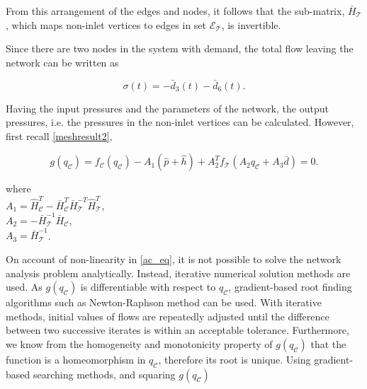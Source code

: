 From this arrangement of the edges and nodes, it follows that the sub-matrix, $\bar{H}_{\mathcal{T}}$, which maps non-inlet vertices to edges in set $\mathcal{E}_{\mathcal{T}}$, is invertible. 

Since there are two nodes in the system with demand, the total flow leaving the network can be written as

\begin{equation}
  \label{consumption1}
  \sigma(t) = -\bar{d}_3(t) - \bar{d}_6(t).
\end{equation}

Having the input pressures and the parameters of the network, the output pressures, i.e. the pressures in the non-inlet vertices can be calculated. However, first recall \eqref{meshresult2}, 

\begin{equation}
  \label{ac_eq} 
  g(q_{\mathcal{C}}) = f_{\mathcal{C}}(q_\mathcal{C}) - A_1(\hat{p} + \hat{h}) + A_2^T f_{\mathcal{T}}(A_2 q_\mathcal{C} + A_3 \bar{d}) = 0.
\end{equation}

\begin{minipage}[t]{0.4\textwidth}
where\\
\hspace*{8mm} $A_1 = \hat{H}^T_{\mathcal{C}} -\bar{H}^T_{\mathcal{C}}\bar{H}^{-T}_{\mathcal{T}}\hat{H}^T_{\mathcal{T}}$, \vspace*{1.5mm}  \\
\hspace*{8mm} $A_2 = -\bar{H}^{-1}_{\mathcal{T}} \bar{H}_{\mathcal{C}} $, \vspace*{1.5mm}\\
\hspace*{8mm} $A_3 = \bar{H}^{-1}_{\mathcal{T}}$. 
\end{minipage}

On account of non-linearity in \eqref{ac_eq},  it is not possible to solve the network analysis problem analytically. Instead, iterative numerical solution methods are used. As $g(q_{\mathcal{C}})$ is differentiable with respect to $q_{\mathcal{C}}$, gradient-based root finding algorithms such as Newton-Raphson method can be used. With iterative methods, initial values of flows are repeatedly adjusted until the difference between two successive iterates is within an acceptable tolerance.  Furthermore, we know from the homogeneity and monotonicity property of $g(q_{\mathcal{C}})$ that the function is a homeomorphism in $q_{\mathcal{C}}$, therefore its root is unique. Using gradient-based searching methods, and squaring $g(q_{\mathcal{C}})$ 

